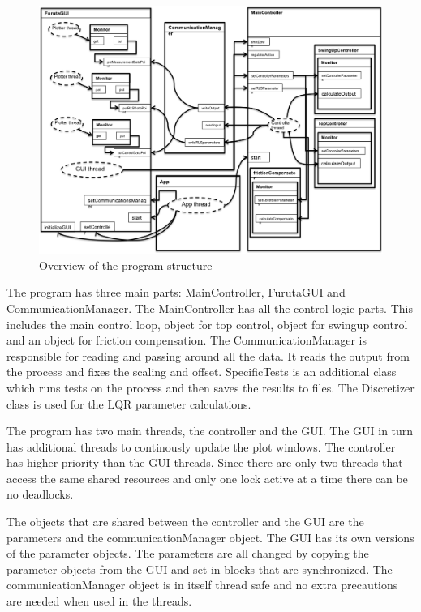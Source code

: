 \documentclass[10pt,a4paper]{article}
\begin{document}
\begin{figure}[!htb]
\centering
\includegraphics[width=1\textwidth]{notUml.png}
\caption{Overview of the program structure}
\label{fig:uml}
\end{figure}


The program has three main parts: MainController, FurutaGUI and CommunicationManager. The MainController has all the control logic parts. This includes the main control loop, object for top control, object for swingup control and an object for friction compensation. The CommunicationManager is responsible for reading and passing around all the data. It reads the output from the process and fixes the scaling and offset. SpecificTests is an additional class which runs tests on the process and then saves the results to files. The Discretizer class is used for the LQR parameter calculations.

The program has two main threads, the controller and the GUI. The GUI in turn has additional threads to continously update the plot windows. The controller has higher priority than the GUI threads. Since there are only two threads that access the same shared resources and only one lock active at a time there can be no deadlocks.

The objects that are shared between the controller and the GUI are the parameters and the communicationManager object. The GUI has its own versions of the parameter objects. The parameters are all changed by copying the parameter objects from the GUI and set in blocks that are synchronized. The communicationManager object is in itself thread safe and no extra precautions are needed when used in the threads.
\end{document}
